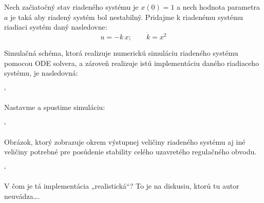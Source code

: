 \documentclass[a4paper, 10pt, ]{article}
\begin{document}
Nech začiatočný stav riadeného systému je $x(0) = 1$ a nech hodnota parametra $a$ je taká aby riadený systém bol nestabilný. Pridajme k riadenému systému riadiaci systém daný nasledovne:
\begin{equation}
	u = -k\, x; \qquad \dot{k} = x^2
\end{equation}


Simulačná schéma, ktorá realizuje numerickú simuláciu riadeného systému pomocou ODE solvera, a zároveň realizuje istú implementáciu daného riadiaceho systému, je nasledovná:


{\catcode`

}

\noindent
Nastavme a spustime simuláciu:

{\catcode`

}


\noindent
Obrázok, ktorý zobrazuje okrem výstupnej veličiny riadeného systému aj iné veličiny potrebné pre posúdenie stability celého uzavretého regulačného obvodu.

{\catcode`

}


\begin{centering}


    \vspace{-2mm}

    \figcaption{}

    \vspace{2mm}

    \label{figsc_ar02_f03_f01_0}

\end{centering}

\noindent
V čom je tá implementácia „realistická“? To je na diskusiu, ktorú tu autor neuvádza\ldots.
\end{document}
